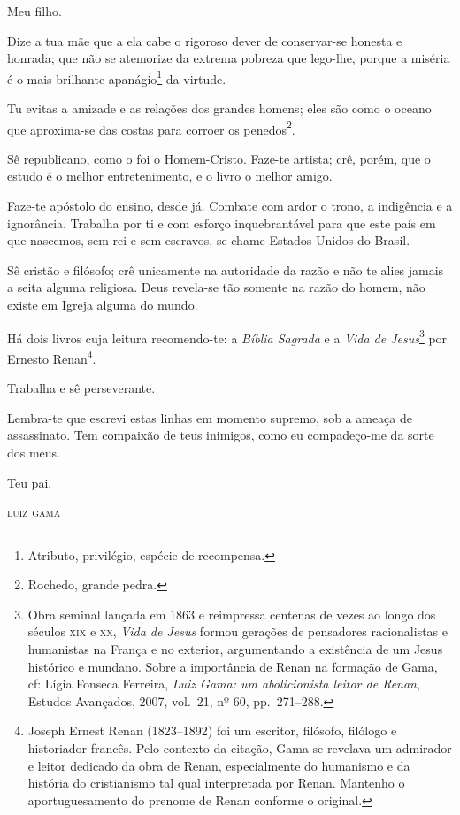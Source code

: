 Meu filho.

Dize a tua mãe que a ela cabe o rigoroso dever de conservar-se honesta e
honrada; que não se atemorize da extrema pobreza que lego-lhe, porque a
miséria é o mais brilhante apanágio\footnote{ Atributo, privilégio,
  espécie de recompensa.} da virtude.

Tu evitas a amizade e as relações dos grandes homens; eles são como o
oceano que aproxima-se das costas para corroer os penedos\footnote{
  Rochedo, grande pedra.}.

Sê republicano, como o foi o Homem-Cristo. Faze-te artista; crê, porém,
que o estudo é o melhor entretenimento, e o livro o melhor amigo.

Faze-te apóstolo do ensino, desde já. Combate com ardor o trono, a
indigência e a ignorância. Trabalha por ti e com esforço inquebrantável
para que este país em que nascemos, sem rei e sem escravos, se chame
Estados Unidos do Brasil.

Sê cristão e filósofo; crê unicamente na autoridade da razão e não te
alies jamais a seita alguma religiosa. Deus revela-se tão somente na
razão do homem, não existe em Igreja alguma do mundo.

Há dois livros cuja leitura recomendo-te: a \emph{Bíblia Sagrada} e a
\emph{Vida de Jesus}\footnote{Obra seminal lançada em 1863 e
  reimpressa centenas de vezes ao longo dos séculos \textsc{xix} e \textsc{xx}, \emph{Vida
  de Jesus} formou gerações de pensadores racionalistas e humanistas na
  França e no exterior, argumentando a existência de um Jesus histórico
  e mundano. Sobre a importância de Renan na formação de Gama, cf: Lígia
  Fonseca Ferreira, \emph{Luiz Gama: um abolicionista leitor de Renan},
  Estudos Avançados, 2007, vol.~21, nº 60, pp.~271--288.} por Ernesto
Renan\footnote{ Joseph Ernest Renan (1823--1892) foi um escritor,
  filósofo, filólogo e historiador francês. Pelo contexto da citação,
  Gama se revelava um admirador e leitor dedicado da obra de Renan,
  especialmente do humanismo e da história do cristianismo tal qual
  interpretada por Renan. Mantenho o aportuguesamento do prenome de
  Renan conforme o original.}.

Trabalha e sê perseverante.

Lembra-te que escrevi estas linhas em momento supremo, sob a ameaça de
assassinato. Tem compaixão de teus inimigos, como eu compadeço-me da
sorte dos meus.

\begin{flushright}
Teu pai,

\textsc{luiz gama}
\end{flushright}


